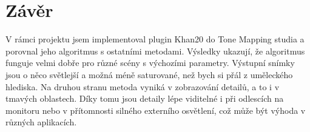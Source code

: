 \documentclass[11pt,a4paper,oneside]{article}
\begin{document}
\section{Závěr}

V rámci projektu jsem implementoval plugin Khan20 do Tone Mapping studia a
porovnal jeho algoritmus s ostatními metodami. Výsledky ukazují, že algoritmus
funguje velmi dobře pro různé scény s výchozími parametry. Výstupní snímky jsou
o něco světlejší a možná méně saturované, než bych si přál z uměleckého
hlediska. Na druhou stranu metoda vyniká v zobrazování detailů, a to i v tmavých
oblastech. Díky tomu jsou detaily lépe viditelné i při odlescích na monitoru
nebo v přítomnosti silného externího osvětlení, což může být výhoda v různých
aplikacích.



\end{document}
